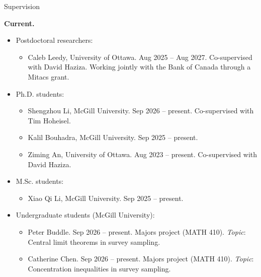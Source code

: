 \documentclass{resume}
\begin{document}
\begin{rSection}{Supervision}
\vspace{2mm}

\textbf{Current.}
\begin{itemize}
\item Postdoctoral researchers:
\begin{itemize}
  \item[--] Caleb Leedy, University of Ottawa. Aug 2025 -- Aug 2027. Co-supervised with David Haziza. Working jointly with the Bank of Canada through a Mitacs grant.
\end{itemize}

\item Ph.D. students:
\begin{itemize}
  \item[--] Shengzhou Li, McGill University. Sep 2026 -- present. Co-supervised with Tim Hoheisel.
  \item[--] Kalil Bouhadra, McGill University. Sep 2025 -- present.
  \item[--] Ziming An, University of Ottawa. Aug 2023 -- present. Co-supervised with David Haziza.
\end{itemize}

\item M.Sc. students:
\begin{itemize}
  \item[--] Xiao Qi Li, McGill University. Sep 2025 -- present.
\end{itemize}

\item Undergraduate students (McGill University):
\begin{itemize}
  \item[--] Peter Buddle. Sep 2026 -- present. Majors project (MATH 410). \emph{Topic}: Central limit theorems in survey sampling.
  \item[--] Catherine Chen. Sep 2026 -- present. Majors project (MATH 410). \emph{Topic}: Concentration inequalities in survey sampling.
\end{itemize}
\end{itemize}


\end{rSection}
\end{document}
